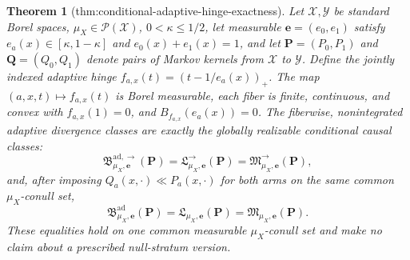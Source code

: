 \documentclass{article}
\newtheorem{theorem}{Theorem}
\begin{document}
\begin{theorem}[thm:conditional-adaptive-hinge-exactness]\label{thm:conditional-adaptive-hinge-exactness}
Let \(\mathcal X,\mathcal Y\) be standard Borel spaces, \(\mu_X\in\mathcal P(\mathcal X)\), \(0<\kappa\le1/2\), let measurable \(\boldsymbol e=(e_0,e_1)\) satisfy \(e_a(x)\in[\kappa,1-\kappa]\) and \(e_0(x)+e_1(x)=1\), and let \(\boldsymbol P=(P_0,P_1)\) and \(\boldsymbol Q=(Q_0,Q_1)\) denote pairs of Markov kernels from \(\mathcal X\) to \(\mathcal Y\).  Define the jointly indexed adaptive hinge \(f_{a,x}(t)=(t-1/e_a(x))_+\).  The map \((a,x,t)\mapsto f_{a,x}(t)\) is Borel measurable, each fiber is finite, continuous, and convex with \(f_{a,x}(1)=0\), and \(B_{f_{a,x}}(e_a(x))=0\).  The fiberwise, nonintegrated adaptive divergence classes are exactly the globally realizable conditional causal classes:
\[
 \mathfrak B^{\mathrm{ad},\to}_{\mu_X,\boldsymbol e}(\boldsymbol P)
 =\mathfrak L^{\to}_{\mu_X,\boldsymbol e}(\boldsymbol P)
 =\mathfrak M^{\to}_{\mu_X,\boldsymbol e}(\boldsymbol P),
\]
and, after imposing \(Q_a(x,\cdot)\ll P_a(x,\cdot)\) for both arms on the same common \(\mu_X\)-conull set,
\[
 \mathfrak B^{\mathrm{ad}}_{\mu_X,\boldsymbol e}(\boldsymbol P)
 =\mathfrak L_{\mu_X,\boldsymbol e}(\boldsymbol P)
 =\mathfrak M_{\mu_X,\boldsymbol e}(\boldsymbol P).
\]
These equalities hold on one common measurable \(\mu_X\)-conull set and make no claim about a prescribed null-stratum version.
\end{theorem}
\end{document}
